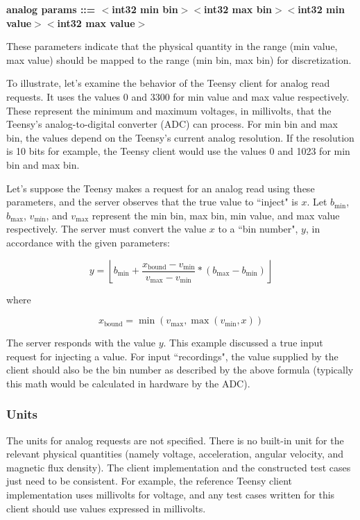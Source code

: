 \documentclass[12pt]{article}
\begin{document}
\begin{appendices}
\footnotesize
\textbf{analog params ::= $<$int32 min bin$>$$<$int32 max bin$>$$<$int32 min value$>$$<$int32 max value$>$}
\normalsize

\noindent These parameters indicate that the physical quantity in the range (min value, max value) should be mapped to the range (min bin, max bin) for discretization.

To illustrate, let's examine the behavior of the Teensy client for analog read requests.  It uses the values 0 and 3300 for min value and max value respectively.  These represent the minimum and maximum voltages, in millivolts, that the Teensy's analog-to-digital converter (ADC) can process.  For min bin and max bin, the values depend on the Teensy's current analog resolution.  If the resolution is 10 bits for example, the Teensy client would use the values 0 and 1023 for min bin and max bin.

Let's suppose the Teensy makes a request for an analog read using these parameters, and the server observes that the true value to ``inject" is $x$.  Let $b_{\text{min}}$, $b_{\text{max}}$, $v_{\text{min}}$, and $v_{\text{max}}$ represent the min bin, max bin, min value, and max value respectively.  The server must convert the value $x$ to a ``bin number", $y$, in accordance with the given parameters:

$$y = \left \lfloor b_{\text{min}} + \frac{x_{\text{bound}}-v_{\text{min}}}{v_{\text{max}}-v_{\text{min}}} * (b_{\text{max}}-b_{\text{min}}) \right \rfloor$$

where

$$x_{\text{bound}} = \min(v_{\text{max}}, \max(v_{\text{min}}, x))$$

The server responds with the value $y$.  This example discussed a true input request for injecting a value.  For input ``recordings", the value supplied by the client should also be the bin number as described by the above formula (typically this math would be calculated in hardware by the ADC).

\subsubsection{Units}
The units for analog requests are not specified.  There is no built-in unit for the relevant physical quantities (namely voltage, acceleration, angular velocity, and magnetic flux density).  The client implementation and the constructed test cases just need to be consistent.  For example, the reference Teensy client implementation uses millivolts for voltage, and any test cases written for this client should use values expressed in millivolts.


\end{appendices}
\end{document}
